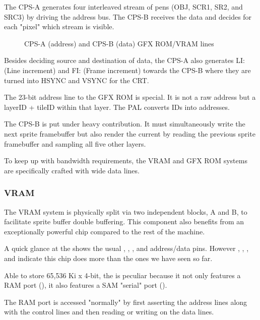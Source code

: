  The CPS-A generates four interleaved stream of pens (OBJ, SCR1, SR2, and SRC3) by driving the address bus.
  The CPS-B receives the data and decides for each "pixel" which stream is visible. 


\begin{figure}[H]
\caption*{CPS-A (address) and CPS-B (data) GFX ROM/VRAM lines}
\end{figure}

Besides deciding source and destination of data, the CPS-A also generates LI: (Line increment) and FI: (Frame increment) towards the CPS-B where they are turned into HSYNC and VSYNC for the CRT.

The 23-bit address line to the GFX ROM is special. It is not a raw address but a layerID + tileID within that layer. The PAL  converts IDs into addresses.


The CPS-B is put under heavy contribution. It must simultaneously write the next sprite framebuffer but also render the current by reading the previous sprite framebuffer and sampling all five other layers.


To keep up with bandwidth requirements, the VRAM and GFX ROM systems are specifically crafted with wide data lines.








\subsubsection{VRAM}
The VRAM system is physically split via two independent blocks, A and B, to facilitate sprite buffer double buffering. This component also benefits from an exceptionally powerful chip compared to the rest of the machine.

A quick glance at the  shows the usual , , , and address/data pins. However , , , and  indicate this chip does more than the ones we have seen so far.


Able to store 65,536 Ki x 4-bit, the  is peculiar because it not only features a RAM port (), it also features a SAM "serial" port ().
 
The RAM port is accessed "normally" by first asserting the address lines along with the control lines and then reading or writing on the data lines.

